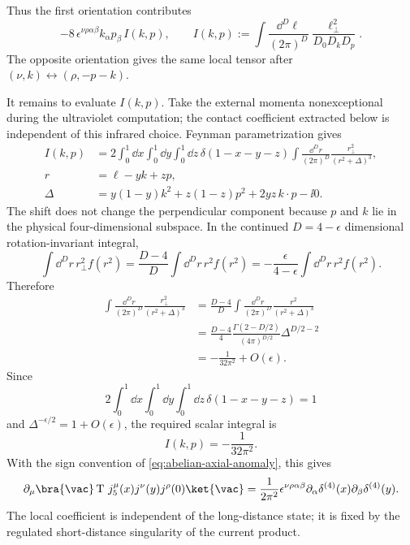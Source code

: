 Thus the first orientation contributes
\[
  -8\,\epsilon^{\nu\rho\alpha\beta}k_\alpha p_\beta\,
  I(k,p),
  \qquad
  I(k,p):=
  \int\frac{\dd^D\ell}{(2\pi)^D}
  \frac{\ell_\perp^2}{D_0D_kD_p}.
\]
The opposite orientation gives the same local tensor after
\((\nu,k)\leftrightarrow(\rho,-p-k)\).

It remains to evaluate \(I(k,p)\).  Take the external momenta nonexceptional
during the ultraviolet computation; the contact coefficient extracted below is
independent of this infrared choice.  Feynman parametrization gives
\[
\begin{aligned}
  I(k,p)
  &=
  2\int_0^1\dd x\int_0^1\dd y\int_0^1\dd z\,
  \delta(1-x-y-z)
  \int\frac{\dd^D r}{(2\pi)^D}
  \frac{r_\perp^2}{(r^2+\Delta)^{3}},
\\
  r&=\ell-y k+z p,
\\
  \Delta
  &=
  y(1-y)k^2+z(1-z)p^2+2yz\,k\cdot p-\ii0 .
\end{aligned}
\]
The shift does not change the perpendicular component because \(p\) and \(k\)
lie in the physical four-dimensional subspace.  In the continued
\(D=4-\epsilon\) dimensional rotation-invariant integral,
\[
  \int\dd^D r\,r_\perp^2 f(r^2)
  =
  \frac{D-4}{D}
  \int\dd^D r\,r^2 f(r^2)
  =
  -\frac{\epsilon}{4-\epsilon}
  \int\dd^D r\,r^2 f(r^2).
\]
Therefore
\[
\begin{aligned}
  \int\frac{\dd^D r}{(2\pi)^D}
  \frac{r_\perp^2}{(r^2+\Delta)^3}
  &=
  \frac{D-4}{D}
  \int\frac{\dd^D r}{(2\pi)^D}
  \frac{r^2}{(r^2+\Delta)^3}
\\
  &=
  \frac{D-4}{4}
  \frac{\Gamma(2-D/2)}{(4\pi)^{D/2}}
  \Delta^{D/2-2}
\\
  &=
  -\frac1{32\pi^2}+O(\epsilon).
\end{aligned}
\]
Since
\[
  2\int_0^1\dd x\int_0^1\dd y\int_0^1\dd z\,
  \delta(1-x-y-z)=1
\]
and
\(\Delta^{-\epsilon/2}=1+O(\epsilon)\), the required scalar integral is
\[
  I(k,p)
  =
  -\frac1{32\pi^2}.
\]
With the sign convention of \eqref{eq:abelian-axial-anomaly}, this gives
\begin{equation}
  \partial_\mu
  \bra{\vac}
  \operatorname T\,j_5^\mu(x)j^\nu(y)j^\rho(0)
  \ket{\vac}
  =
  \frac1{2\pi^2}
  \epsilon^{\nu\rho\alpha\beta}
  \partial_\alpha\delta^{(4)}(x)
  \partial_\beta\delta^{(4)}(y).
  \label{eq:four-dimensional-triangle-contact-term}
\end{equation}
The local coefficient is independent of the long-distance state; it is fixed
by the regulated short-distance singularity of the current product.

